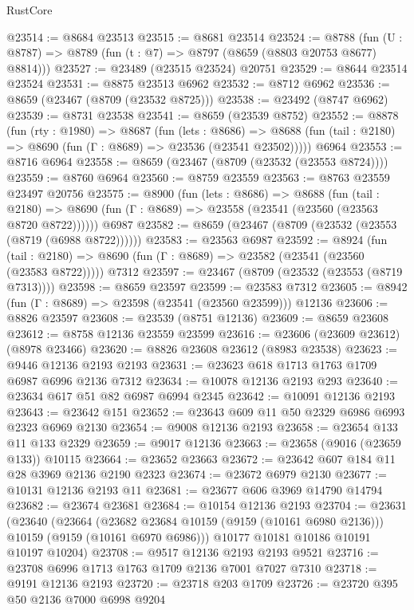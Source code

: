 \begin{lexlean}{RustCore}
\begin{coremodule}
@23514 := @8684 @23513
@23515 := @8681 @23514
@23524 := @8788
    (fun (U : @8787) => @8789 (fun (t : @7) => @8797 (@8659 (@8803 @20753 @8677) @8814)))
@23527 := @23489 (@23515 @23524) @20751
@23529 := @8644 @23514 @23524
@23531 := @8875 @23513 @6962
@23532 := @8712 @6962
@23536 := @8659 (@23467 (@8709 (@23532 @8725)))
@23538 := @23492 (@8747 @6962)
@23539 := @8731 @23538
@23541 := @8659 (@23539 @8752)
@23552 := @8878
    (fun (rty : @1980) =>
    @8687
      (fun (lets : @8686) =>
      @8688 (fun (tail : @2180) => @8690 (fun (Γ : @8689) => @23536 (@23541 @23502)))))
    @6964
@23553 := @8716 @6964
@23558 := @8659 (@23467 (@8709 (@23532 (@23553 @8724))))
@23559 := @8760 @6964
@23560 := @8759 @23559
@23563 := @8763 @23559 @23497 @20756
@23575 := @8900
    (fun (lets : @8686) =>
    @8688
      (fun (tail : @2180) =>
      @8690 (fun (Γ : @8689) => @23558 (@23541 (@23560 (@23563 @8720 @8722))))))
    @6987
@23582 := @8659 (@23467 (@8709 (@23532 (@23553 (@8719 (@6988 @8722))))))
@23583 := @23563 @6987
@23592 := @8924
    (fun (tail : @2180) => @8690 (fun (Γ : @8689) => @23582 (@23541 (@23560 (@23583 @8722)))))
    @7312
@23597 := @23467 (@8709 (@23532 (@23553 (@8719 @7313))))
@23598 := @8659 @23597
@23599 := @23583 @7312
@23605 := @8942 (fun (Γ : @8689) => @23598 (@23541 (@23560 @23599))) @12136
@23606 := @8826 @23597
@23608 := @23539 (@8751 @12136)
@23609 := @8659 @23608
@23612 := @8758 @12136 @23559 @23599
@23616 := @23606 (@23609 @23612) (@8978 @23466)
@23620 := @8826 @23608 @23612 (@8983 @23538)
@23623 := @9446 @12136 @2193 @2193
@23631 := @23623 @618 @1713 @1763 @1709 @6987 @6996 @2136 @7312
@23634 := @10078 @12136 @2193 @293
@23640 := @23634 @617 @51 @82 @6987 @6994 @2345
@23642 := @10091 @12136 @2193
@23643 := @23642 @151
@23652 := @23643 @609 @11 @50 @2329 @6986 @6993 @2323 @6969 @2130
@23654 := @9008 @12136 @2193
@23658 := @23654 @133 @11 @133 @2329
@23659 := @9017 @12136
@23663 := @23658 (@9016 (@23659 @133)) @10115
@23664 := @23652 @23663
@23672 := @23642 @607 @184 @11 @28 @3969 @2136 @2190 @2323
@23674 := @23672 @6979 @2130
@23677 := @10131 @12136 @2193 @11
@23681 := @23677 @606 @3969 @14790 @14794
@23682 := @23674 @23681
@23684 := @10154 @12136 @2193
@23704 := @23631
    (@23640
      (@23664
        (@23682 @23684 @10159 (@9159 (@10161 @6980 @2136)))
        @10159
        (@9159 (@10161 @6970 @6986)))
      @10177
      @10181
      @10186
      @10191
      @10197
      @10204)
@23708 := @9517 @12136 @2193 @2193 @9521
@23716 := @23708 @6996 @1713 @1763 @1709 @2136 @7001 @7027 @7310
@23718 := @9191 @12136 @2193
@23720 := @23718 @203 @1709
@23726 := @23720 @395 @50 @2136 @7000 @6998 @9204

\end{coremodule}
\end{lexlean}
